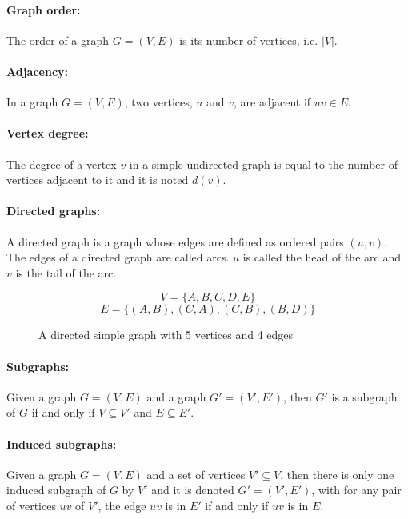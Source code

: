 \paragraph{Graph order:}
The order of a graph $G=(V,E)$ is its number of vertices, i.e. $|V|$.

\paragraph{Adjacency:}
In a graph $G=(V,E)$, two vertices, $u$ and $v$, are adjacent if $uv \in E$.

\paragraph{Vertex degree:}
The degree of a vertex $v$ in a simple undirected graph is equal to the number of
vertices adjacent to it and it is noted $d(v)$.

\paragraph{Directed graphs:} 
A directed graph is a graph whose edges are defined as ordered pairs
$(u,v)$. The edges of a directed graph are called arcs. 
$u$ is called the head of the arc and $v$ is the tail of the arc.
\begin{figure}[!h]
  \begin{center}
    
  \end{center}
  $$V = \{A,B,C,D,E\}$$
  $$E = \Big\{(A,B),(C,A),(C,B),(B,D)\Big\}$$
  \caption{A directed simple graph with 5 vertices and 4 edges}
\end{figure}

\paragraph{Subgraphs:}
Given a graph $G = (V,E)$ and a graph $G' = (V',E')$, then $G'$ is a subgraph of $G$ 
if and only if $V \subseteq V'$ and $E \subseteq E'$.

\paragraph{Induced subgraphs:}
Given a graph $G = (V,E)$ and a set of vertices $V' \subseteq V$, then
there is only one induced subgraph of $G$ by $V'$ and it is denoted
$G' = (V',E')$, with for any pair of vertices $uv$ of $V'$, the edge $uv$ is
in $E'$ if and only if $uv$ is in $E$.

